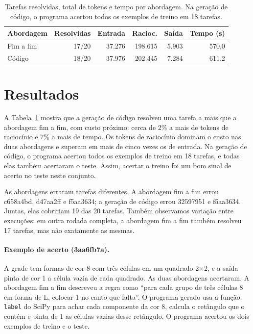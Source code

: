 \documentclass{article}
\begin{document}
\begin{table}[h]
  \centering
  \small
  \setlength{\tabcolsep}{3pt}
  \begin{tabular}{lrrrrr}
    \toprule
    Abordagem   & Resolvidas & Entrada & Racioc. & Saída & Tempo (s) \\
    \midrule
    Fim a fim   & 17/20      & 37.276  & 198.615 & 5.903 & 570,0     \\
    Código      & 18/20      & 37.976  & 202.445 & 7.284 & 611,2     \\
    \bottomrule
  \end{tabular}
  \caption{Tarefas resolvidas, total de tokens e tempo por abordagem. Na geração de código,
  o programa acertou todos os exemplos de treino em 18 tarefas.}
  \label{tab:resultados}
\end{table}

\section{Resultados}

A Tabela~\ref{tab:resultados} mostra que a geração de código resolveu uma tarefa a mais que a
abordagem fim a fim, com custo próximo: cerca de 2\% a mais de tokens de raciocínio e 7\% a
mais de tempo. Os tokens de raciocínio dominam o custo nas duas abordagens e superam em mais
de cinco vezes os de entrada. Na geração de código, o programa acertou todos os exemplos de
treino em 18 tarefas, e todas elas também acertaram o teste. Assim, acertar o treino foi um
bom sinal de acerto no teste neste conjunto.

As abordagens erraram tarefas diferentes. A abordagem fim a fim errou c658a4bd, d47aa2ff e
f5aa3634; a geração de código errou 32597951 e f5aa3634. Juntas, elas cobririam 19 das 20
tarefas. Também observamos variação entre execuções: em outra rodada completa, a abordagem fim
a fim também resolveu 17 tarefas, mas não exatamente as mesmas.

\paragraph{Exemplo de acerto (3aa6fb7a).} A grade tem formas de cor 8 com três células em um
quadrado 2$\times$2, e a saída pinta de cor 1 a célula vazia de cada quadrado. As duas
abordagens acertaram. A abordagem fim a fim descreveu a regra como ``para cada grupo de três
células 8 em forma de L, colocar 1 no canto que falta''. O programa gerado usa a função
\texttt{label} do SciPy para achar cada componente da cor 8, calcula o retângulo que o
contém e pinta de 1 as células vazias desse retângulo. O programa acertou os dois exemplos de
treino e o teste.
\end{document}
